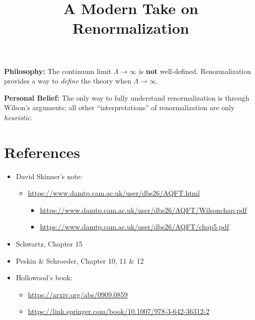 \documentclass[a4paper
	,10pt
]{article}
\title{A Modern Take on Renormalization}
\begin{document}
\maketitle
{}
\thispagestyle{empty}

\vspace*{-.5\baselineskip}
	\textbf{Philosophy:} The continuum limit $\Lambda\to\infty$ is \textbf{not} well-defined.
	Renormalization provides a way to \emph{define} the theory when
	$\Lambda\to\infty$.
	
	\textbf{Personal Belief:} The only way to fully understand renormalization is
	through Wilson's arguments; all other ``interpretations'' of
	renormalization are only \emph{heuristic}.



\setlength{\parskip}{.1\baselineskip}
\tableofcontents
\setlength{\parskip}{\parskipnorm}

\addtocounter{section}{-1}
\section{References}


	\begin{itemize}[parsep=0pt,itemsep=.5\parskip,labelindent=.1\parindent]
	\item David Skinner's note:
	  \begin{itemize}[nosep]
	  \item \url{https://www.damtp.cam.ac.uk/user/dbs26/AQFT.html}
	    \begin{itemize}[nosep]
	    \item \url{https://www.damtp.cam.ac.uk/user/dbs26/AQFT/Wilsonchap.pdf}
	    \item \url{https://www.damtp.cam.ac.uk/user/dbs26/AQFT/chap5.pdf}
	    \end{itemize}
	  \end{itemize}
	\item Schwartz, Chapter 15
	\item Peskin \& Schroeder, Chapter 10, 11 \& 12
	\item Hollowood's book:
	  \begin{itemize}[nosep]
	  \item \url{https://arxiv.org/abs/0909.0859}
	  \item \url{https://link.springer.com/book/10.1007/978-3-642-36312-2}
	  \end{itemize}
	\end{itemize}
\end{document}
